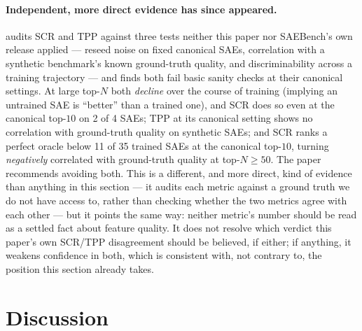 \documentclass[11pt]{article}
\begin{document}
\paragraph{Independent, more direct evidence has since appeared.}
\citet{chanin2026reliable} audits SCR and TPP against three tests neither
this paper nor SAEBench's own release applied --- reseed noise on fixed
canonical SAEs, correlation with a synthetic benchmark's known ground-truth
quality, and discriminability across a training trajectory --- and finds
both fail basic sanity checks at their canonical settings. At large top-$N$
both \emph{decline} over the course of training (implying an untrained SAE is
``better'' than a trained one), and SCR does so even at the canonical
top-$10$ on 2 of 4 SAEs; TPP at its canonical setting shows no correlation
with ground-truth quality on synthetic SAEs; and SCR ranks a perfect oracle
below 11 of 35 trained SAEs at the canonical top-$10$, turning
\emph{negatively} correlated with ground-truth quality at top-$N\ge50$. The
paper recommends avoiding both.
This is a different, and more direct, kind of evidence than anything in
this section --- it audits each metric against a ground truth we do not
have access to, rather than checking whether the two metrics agree with
each other --- but it points the same way: neither metric's number should
be read as a settled fact about feature quality. It does not resolve which
verdict this paper's own SCR/TPP disagreement should be believed, if
either; if anything, it weakens confidence in both, which is consistent
with, not contrary to, the position this section already takes.

\section{Discussion}
\label{sec:discussion}
\end{document}
